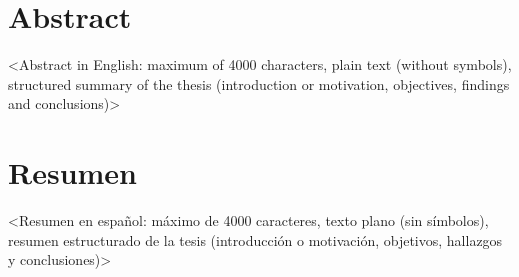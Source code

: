 %

\section*{Abstract}
\label{sec::abstract}

<Abstract in English: maximum of 4000 characters, plain text (without symbols), structured summary of the thesis (introduction or motivation, objectives, findings and conclusions)>


\newpage
\section*{Resumen}
\label{sec::resumen}


<Resumen en español: máximo de 4000 caracteres, texto plano (sin símbolos), resumen estructurado de la tesis (introducción o motivación, objetivos, hallazgos y conclusiones)>


